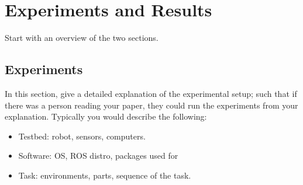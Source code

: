 \documentclass[conference]{IEEEtran}
\begin{document}
\section{Experiments and Results}\label{sec:experiments}
Start with an overview of the two sections.
\subsection{Experiments}\label{sec:experiments}
In this section, give a detailed explanation of the experimental setup; such that if there was a person reading your paper, they could run the experiments from your explanation. Typically you would describe the following:
\begin{itemize}
    \item Testbed: robot, sensors, computers.
    \item Software: OS, ROS distro, packages used for 
    \item Task: environments, parts, sequence of the task.
\end{itemize}
\end{document}
